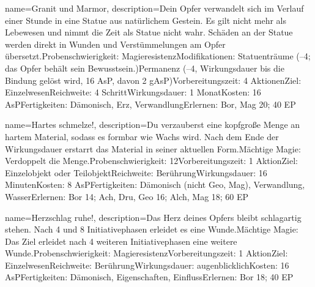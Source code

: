 {
    name={Granit und Marmor},
    description={Dein Opfer verwandelt sich im Verlauf einer Stunde in eine Statue aus natürlichem Gestein. Es gilt nicht mehr als Lebewesen und nimmt die Zeit als Statue nicht wahr. Schäden an der Statue werden direkt in Wunden und Verstümmelungen am Opfer übersetzt.\newline Probenschwierigkeit: Magieresistenz\newline Modifikationen: Statuenträume (–4; das Opfer behält sein Bewusstsein.)\newline Permanenz (–4, Wirkungsdauer bis die Bindung gelöst wird, 16 AsP, davon 2 gAsP)\newline Vorbereitungszeit: 4 Aktionen\newline Ziel: Einzelwesen\newline Reichweite: 4 Schritt\newline Wirkungsdauer: 1 Monat\newline Kosten: 16 AsP\newline Fertigkeiten: Dämonisch, Erz, Verwandlung\newline Erlernen: Bor, Mag 20; 40 EP}
}


{
    name={Hartes schmelze!},
    description={Du verzauberst eine kopfgroße Menge an hartem Material, sodass es formbar wie Wachs wird. Nach dem Ende der Wirkungsdauer erstarrt das Material in seiner aktuellen Form.\newline Mächtige Magie: Verdoppelt die Menge.\newline Probenschwierigkeit: 12\newline Vorbereitungszeit: 1 Aktion\newline Ziel: Einzelobjekt oder Teilobjekt\newline Reichweite: Berührung\newline Wirkungsdauer: 16 Minuten\newline Kosten: 8 AsP\newline Fertigkeiten: Dämonisch (nicht Geo, Mag), Verwandlung, Wasser\newline Erlernen: Bor 14; Ach, Dru, Geo 16; Alch, Mag 18; 60 EP}
}


{
    name={Herzschlag ruhe!},
    description={Das Herz deines Opfers bleibt schlagartig stehen. Nach 4 und 8 Initiativephasen erleidet es eine Wunde.\newline Mächtige Magie: Das Ziel erleidet nach 4 weiteren Initiativephasen eine weitere Wunde.\newline Probenschwierigkeit: Magieresistenz\newline Vorbereitungszeit: 1 Aktion\newline Ziel: Einzelwesen\newline Reichweite: Berührung\newline Wirkungsdauer: augenblicklich\newline Kosten: 16 AsP\newline Fertigkeiten: Dämonisch, Eigenschaften, Einfluss\newline Erlernen: Bor 18; 40 EP}
}


